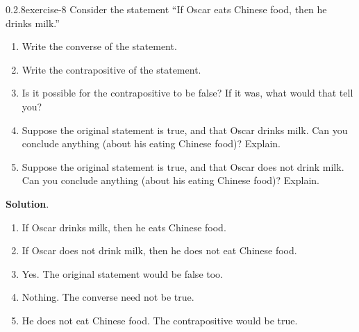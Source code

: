 \documentclass[twoside,11pt,]{book}
\numberwithin{equation}{chapter}
\begin{document}
\begin{divisionsolution}{0.2.8}{}{exercise-8}%
\hypertarget{p-229}{}%
Consider the statement ``If Oscar eats Chinese food, then he drinks milk.''\leavevmode%
\begin{enumerate}[label=(\alph*)]
\item\hypertarget{li-209}{}\hypertarget{p-230}{}%
Write the converse of the statement.%
\item\hypertarget{li-210}{}\hypertarget{p-231}{}%
Write the contrapositive of the statement.%
\item\hypertarget{li-211}{}\hypertarget{p-232}{}%
Is it possible for the contrapositive to be false? If it was, what would that tell you?%
\item\hypertarget{li-212}{}\hypertarget{p-233}{}%
Suppose the original statement is true, and that Oscar drinks milk. Can you conclude anything (about his eating Chinese food)? Explain.%
\item\hypertarget{li-213}{}\hypertarget{p-234}{}%
Suppose the original statement is true, and that Oscar does not drink milk. Can you conclude anything (about his eating Chinese food)? Explain.%
\end{enumerate}
%
\par\smallskip%
\noindent\textbf{Solution}.\quad%
\leavevmode%
\begin{enumerate}[label=(\alph*)]
\item\hypertarget{li-214}{}\hypertarget{p-235}{}%
If Oscar drinks milk, then he eats Chinese food.%
\item\hypertarget{li-215}{}\hypertarget{p-236}{}%
If Oscar does not drink milk, then he does not eat Chinese food.%
\item\hypertarget{li-216}{}\hypertarget{p-237}{}%
Yes. The original statement would be false too.%
\item\hypertarget{li-217}{}\hypertarget{p-238}{}%
Nothing. The converse need not be true.%
\item\hypertarget{li-218}{}\hypertarget{p-239}{}%
He does not eat Chinese food. The contrapositive would be true.%
\end{enumerate}
\end{divisionsolution}%
\end{document}
